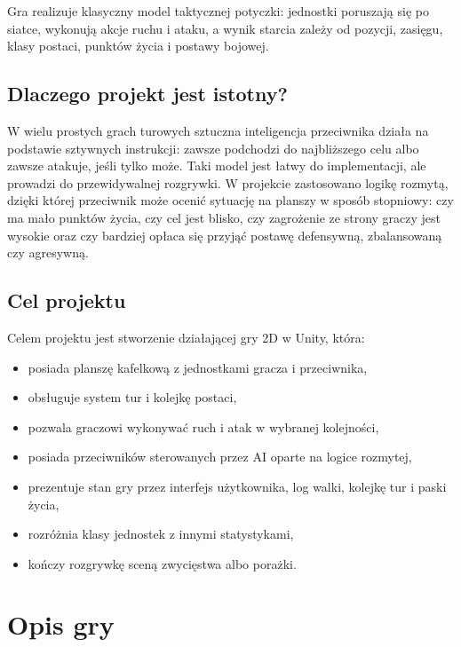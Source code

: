 \documentclass[12pt,a4paper]{article}
\begin{document}
Gra realizuje klasyczny model taktycznej potyczki: jednostki poruszają się po siatce, wykonują akcje ruchu i ataku, a wynik starcia zależy od pozycji, zasięgu, klasy postaci, punktów życia i postawy bojowej.

\subsection{Dlaczego projekt jest istotny?}

W wielu prostych grach turowych sztuczna inteligencja przeciwnika działa na podstawie sztywnych instrukcji: zawsze podchodzi do najbliższego celu albo zawsze atakuje, jeśli tylko może. Taki model jest łatwy do implementacji, ale prowadzi do przewidywalnej rozgrywki. W projekcie zastosowano logikę rozmytą, dzięki której przeciwnik może ocenić sytuację na planszy w sposób stopniowy: czy ma mało punktów życia, czy cel jest blisko, czy zagrożenie ze strony graczy jest wysokie oraz czy bardziej opłaca się przyjąć postawę defensywną, zbalansowaną czy agresywną.

\subsection{Cel projektu}

Celem projektu jest stworzenie działającej gry 2D w Unity, która:

\begin{itemize}
    \item posiada planszę kafelkową z jednostkami gracza i przeciwnika,
    \item obsługuje system tur i kolejkę postaci,
    \item pozwala graczowi wykonywać ruch i atak w wybranej kolejności,
    \item posiada przeciwników sterowanych przez AI oparte na logice rozmytej,
    \item prezentuje stan gry przez interfejs użytkownika, log walki, kolejkę tur i paski życia,
    \item rozróżnia klasy jednostek z innymi statystykami,
    \item kończy rozgrywkę sceną zwycięstwa albo porażki.
\end{itemize}

\newpage

\section{Opis gry}
\end{document}
